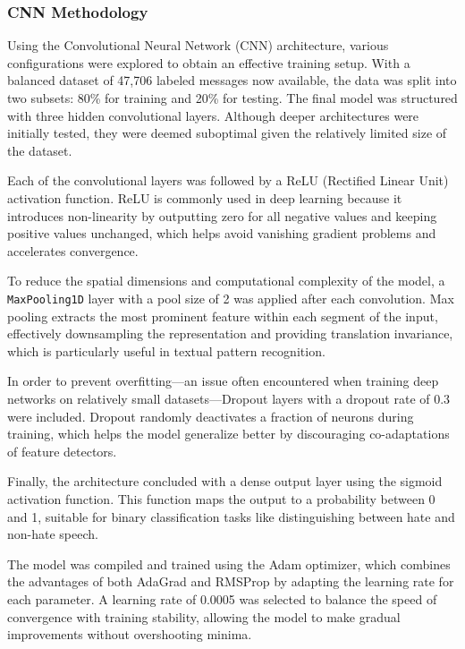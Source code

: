 \subsubsection{CNN Methodology}
\label{sec:cnn}

Using the Convolutional Neural Network (CNN) architecture, various configurations were explored to obtain an effective training setup. With a balanced dataset of 47,706 labeled messages now available, the data was split into two subsets: 80\% for training and 20\% for testing. The final model was structured with three hidden convolutional layers. Although deeper architectures were initially tested, they were deemed suboptimal given the relatively limited size of the dataset.

Each of the convolutional layers was followed by a ReLU (Rectified Linear Unit) activation function. ReLU is commonly used in deep learning because it introduces non-linearity by outputting zero for all negative values and keeping positive values unchanged, which helps avoid vanishing gradient problems and accelerates convergence.

To reduce the spatial dimensions and computational complexity of the model, a \texttt{MaxPooling1D} layer with a pool size of 2 was applied after each convolution. Max pooling extracts the most prominent feature within each segment of the input, effectively downsampling the representation and providing translation invariance, which is particularly useful in textual pattern recognition.

In order to prevent overfitting—an issue often encountered when training deep networks on relatively small datasets—Dropout layers with a dropout rate of 0.3 were included. Dropout randomly deactivates a fraction of neurons during training, which helps the model generalize better by discouraging co-adaptations of feature detectors.

Finally, the architecture concluded with a dense output layer using the sigmoid activation function. This function maps the output to a probability between 0 and 1, suitable for binary classification tasks like distinguishing between hate and non-hate speech.

The model was compiled and trained using the Adam optimizer, which combines the advantages of both AdaGrad and RMSProp by adapting the learning rate for each parameter. A learning rate of 0.0005 was selected to balance the speed of convergence with training stability, allowing the model to make gradual improvements without overshooting minima.

